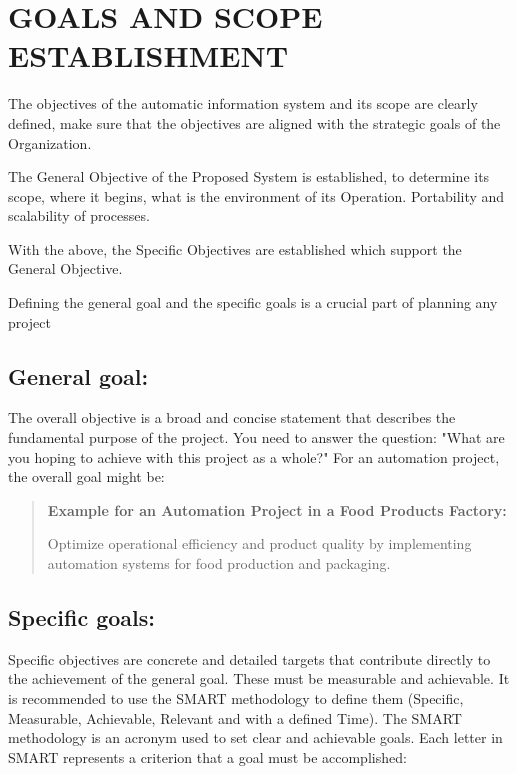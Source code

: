 \documentclass{article}
\begin{document}
\section{GOALS AND SCOPE ESTABLISHMENT}
\par The objectives of the automatic information system and its scope are
clearly defined, make sure that the objectives are aligned with the strategic
goals of the Organization.

\par The General Objective of the Proposed System is established, to determine
its scope, where it begins, what is the environment of its Operation.
Portability and scalability of processes.

\par With the above, the Specific Objectives are established which support the
General Objective.

\par Defining the general goal and the specific goals is a crucial part of
planning any project

\subsection{General goal:}
\par The overall objective is a broad and concise statement that describes the
fundamental purpose of the project. You need to answer the question: "What are
you hoping to achieve with this project as a whole?" For an automation project,
the overall goal might be:

\begin{quote}
	\textbf{Example for an Automation Project in a Food Products Factory:}
	\par Optimize operational efficiency and product quality by implementing
	automation systems for food production and packaging.

\end{quote}

\subsection{Specific goals:}
\par Specific objectives are concrete and detailed targets that contribute
directly to the achievement of the general goal. These must be measurable and
achievable. It is recommended to use the SMART methodology to define them
(Specific, Measurable, Achievable, Relevant and with a defined Time). The SMART
methodology is an acronym used to set clear and achievable goals. Each letter in
SMART represents a criterion that a goal must be accomplished:
\end{document}
